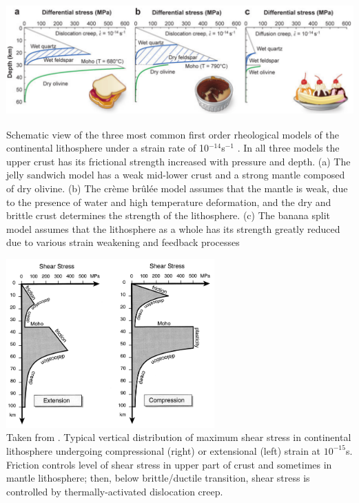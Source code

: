 \begin{center}
\includegraphics[height=5cm]{images/rheology/budr08}\\
{\captionfont Schematic view of the three most common first order rheological models of the continental 
lithosphere under a strain rate of 10$^{-14}$s$^{-1}$ . 
In all three models the upper crust has its frictional strength increased with pressure and depth. 
(a) The jelly sandwich model has a weak mid-lower crust and a strong mantle composed of dry olivine. 
(b) The cr\`eme br\^ul\'ee model assumes that the mantle is weak, due to the presence of water and high 
temperature deformation, and the dry and brittle crust determines the strength of the lithosphere. 
(c) The banana split model assumes that the lithosphere as a whole has its strength greatly reduced
due to various strain weakening and feedback processes \cite{budr08}}
\end{center}

\begin{center}
\includegraphics[width=8cm]{images/rheology/bird99}\\
{\captionfont Taken from \cite{bird99}.
Typical vertical distribution of maximum shear stress in continental lithosphere 
undergoing compressional (right) or extensional (left) strain at $10^{-15}$s. 
Friction controls level of shear stress in upper part of crust and sometimes in mantle lithosphere;
then, below brittle/ductile transition, shear stress is controlled by thermally-activated dislocation creep.}
\end{center}

\Literature \cite{buwa06,budr08,rana97a,rana97b}





